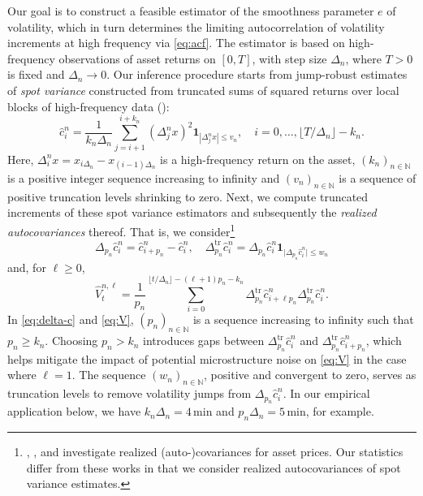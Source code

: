 \documentclass[ecta,nameyear,draft]{econsocart}
\def\wh{\widehat}
\newcommand{\1}{\mathbf 1}
\newcommand{\tr}{\mathrm{tr}}
\numberwithin{equation}{section}
\newcommand{\Den}{\Delta_n}
\begin{document}
Our goal is to construct a feasible estimator of the smoothness parameter $e$ of volatility, which in turn determines the limiting autocorrelation of volatility increments at high frequency via \eqref{eq:acf}. The estimator is based on high-frequency observations of asset returns on  $[0,T]$, with step size $\Delta_n$,  where $T>0$ is fixed and $\Delta_n\to0$. Our inference procedure starts from jump-robust estimates of \emph{spot variance} constructed from truncated sums of squared returns over local blocks of high-frequency data (\cite{ait2014high}):
\begin{equation}\label{eq:c-hat}
	\widehat{c}_{i}^{n} =  \frac{1}{k_n \Delta_n} \sum_{j = i+1}^{i+k_n} (\Delta^n_j x)^2 \1_{|\Delta^n_j x| \leq v_n},\quad i=0,\dots,\lfloor T/\Delta_n\rfloor - k_n.
\end{equation}
Here, $\Delta^n_i x = x_{i\Den}-x_{(i-1)\Den}$ is a high-frequency return on the asset, $(k_n)_{n\in\mathbb{N}}$ is a positive integer sequence increasing to infinity and $(v_n)_{n\in\mathbb{N}}$ is a sequence of positive truncation levels shrinking to zero. Next, we compute truncated increments of these spot variance estimators and subsequently the \emph{realized autocovariances} thereof. That is, we consider\footnote{\cite{BNS04}, \cite{barndorff2008designing}, \cite{LRS24}  and \cite{LY26} investigate realized (auto-)covariances for asset prices. Our statistics differ from these works in that we consider realized autocovariances of spot variance estimates.} 
\begin{equation}\label{eq:delta-c} 
	\Delta_{p_n} \wh c^{n}_i = \wh c^{n}_{i+p_n}-\wh c^{n}_{i},\quad	\Delta^\tr_{p_n} \wh c^{n}_i = \Delta_{p_n} \wh c^{n}_i\1_{\lvert\Delta_{p_n} \wh c^{n}_i\rvert\leq w_n}
\end{equation}
and, for $\ell\geq0$, 
\begin{equation}\label{eq:V}
	\wh {V}^{n,\ell}_t 
	=
	 \frac{1}{p_n} 
	\sum_{i=0}^{\lfloor t/\Delta_n \rfloor - (\ell+1) p_n - k_n}
	\Delta^\tr_{p_n} \wh c^{n}_{i+\ell p_n} 	\Delta^\tr_{p_n} \wh c^{n}_i.
\end{equation}
In \eqref{eq:delta-c} and \eqref{eq:V}, $(p_n)_{n\in\mathbb{N}}$ is a sequence increasing to infinity such that $p_n\geq k_n$. Choosing $p_n > k_n$ introduces gaps between $\Delta^\tr_{p_n} \wh c^{n}_i$ and $\Delta^\tr_{p_n} \wh c^{n}_{i+ p_n}$, which helps mitigate the impact of potential microstructure noise on \eqref{eq:V} in the case where $\ell=1$. The sequence $(w_n)_{n\in\mathbb{N}}$, positive and convergent to zero, serves as truncation levels to remove volatility jumps from $\Delta_{p_n} \wh c^{n}_i$. %
In our empirical application below, we have $k_n\Delta_n = 4\,\mathrm{min}$ and $p_n\Delta_n = 5\,\mathrm{min}$, for example. %
\end{document}
